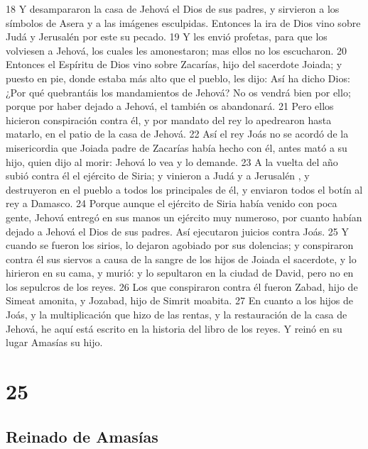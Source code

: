 18 Y desampararon la casa de Jehová el Dios de sus padres, y sirvieron a los símbolos de Asera y a las imágenes esculpidas. Entonces la ira de Dios vino sobre Judá y Jerusalén  por este su pecado.
19 Y les envió profetas, para que los volviesen a Jehová, los cuales les amonestaron; mas ellos no los escucharon.
20 Entonces el Espíritu de Dios vino sobre Zacarías, hijo del sacerdote Joiada; y puesto en pie, donde estaba más alto que el pueblo, les dijo: Así ha dicho Dios: ¿Por qué quebrantáis los mandamientos de Jehová?  No os vendrá bien por ello; porque por haber dejado a Jehová, el también os abandonará.
21 Pero ellos hicieron conspiración contra él, y por mandato del rey lo apedrearon hasta matarlo, en el patio de la casa de Jehová. 
22 Así el rey Joás no se acordó de la misericordia que Joiada padre de Zacarías había hecho con él, antes mató a su hijo, quien dijo al morir: Jehová lo vea y lo demande.
23 A la vuelta del año subió contra él el ejército de Siria; y vinieron a Judá y a Jerusalén , y destruyeron en el pueblo a todos los principales de él, y enviaron todos el botín al rey a Damasco.
24 Porque aunque el ejército de Siria había venido con poca gente, Jehová entregó en sus manos un ejército muy numeroso, por cuanto habían dejado a Jehová el Dios de sus padres. Así ejecutaron juicios contra Joás.
25 Y cuando se fueron los sirios, lo dejaron agobiado por sus dolencias; y conspiraron contra él sus siervos a causa de la sangre de los hijos de Joiada el sacerdote, y lo hirieron en su cama, y murió: y lo sepultaron en la ciudad de David, pero no en los sepulcros de los reyes.
26 Los que conspiraron contra él fueron Zabad, hijo de Simeat amonita, y Jozabad, hijo de Simrit moabita.
27 En cuanto a los hijos de Joás, y la multiplicación que hizo de las rentas, y la restauración de la casa de Jehová, he aquí está escrito en la historia del libro de los reyes. Y reinó en su lugar Amasías su hijo.

\chapter{25}

\section*{Reinado de Amasías}

 

